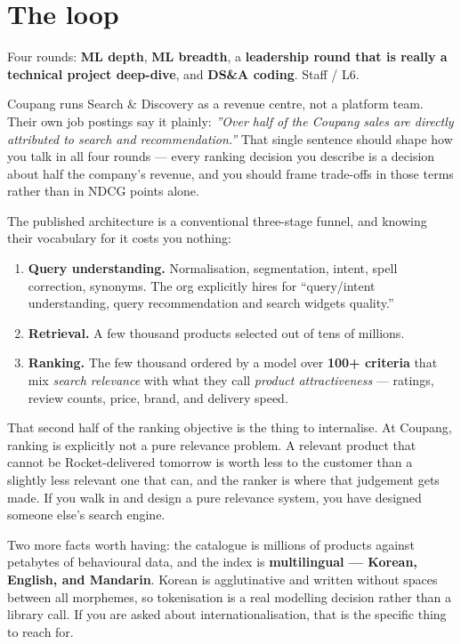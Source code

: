 \documentclass[10pt,twoside]{book}
\newcommand{\cchapter}[1]{\chapter{#1}}
\newcommand{\csection}[1]{\par\vspace{13pt}\noindent{\sffamily\large\bfseries\color{ink}\raggedright #1\par}\vspace{4pt}}
\begin{document}
\cchapter{The loop}
Four rounds: \textbf{ML depth}, \textbf{ML breadth}, a \textbf{leadership round that is really a technical project deep-dive}, and \textbf{DS\&A coding}. Staff / L6.\par
\csection{What the org actually is}
Coupang runs Search \& Discovery as a revenue centre, not a platform team. Their own job postings say it plainly: \textit{''Over half of the Coupang sales are directly attributed to search and recommendation.''} That single sentence should shape how you talk in all four rounds --- every ranking decision you describe is a decision about half the company's revenue, and you should frame trade-offs in those terms rather than in NDCG points alone.\par
The published architecture is a conventional three-stage funnel, and knowing their vocabulary for it costs you nothing:\par
\begin{enumerate}
\item \textbf{Query understanding.} Normalisation, segmentation, intent, spell correction, synonyms. The org explicitly hires for ``query/intent understanding, query recommendation and search widgets quality.''
\item \textbf{Retrieval.} A few thousand products selected out of tens of millions.
\item \textbf{Ranking.} The few thousand ordered by a model over \textbf{100+ criteria} that mix \textit{search relevance} with what they call \textit{product attractiveness} --- ratings, review counts, price, brand, and delivery speed.
\end{enumerate}
That second half of the ranking objective is the thing to internalise. At Coupang, ranking is explicitly not a pure relevance problem. A relevant product that cannot be Rocket-delivered tomorrow is worth less to the customer than a slightly less relevant one that can, and the ranker is where that judgement gets made. If you walk in and design a pure relevance system, you have designed someone else's search engine.\par
Two more facts worth having: the catalogue is millions of products against petabytes of behavioural data, and the index is \textbf{multilingual --- Korean, English, and Mandarin}. Korean is agglutinative and written without spaces between all morphemes, so tokenisation is a real modelling decision rather than a library call. If you are asked about internationalisation, that is the specific thing to reach for.\par
\end{document}
